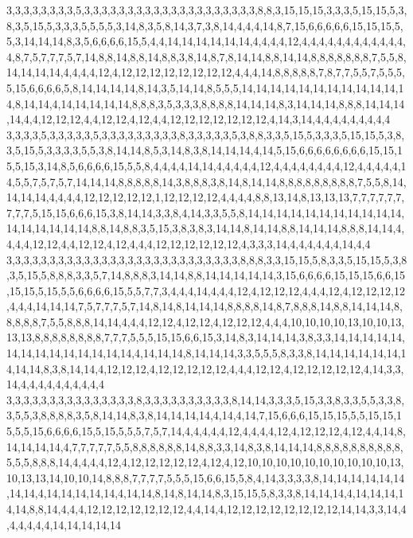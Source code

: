 3,3,3,3,3,3,3,3,5,3,3,3,3,3,3,3,3,3,3,3,3,3,3,3,3,3,3,3,3,8,8,3,15,15,15,3,3,3,5,15,15,5,3,8,3,5,15,5,3,3,3,5,5,5,5,3,14,8,3,5,8,14,3,7,3,8,14,4,4,4,14,8,7,15,6,6,6,6,6,15,15,15,5,5,3,14,14,14,8,3,5,6,6,6,6,15,5,4,4,14,14,14,14,14,14,4,4,4,4,12,4,4,4,4,4,4,4,4,4,4,4,4,4,8,7,5,7,7,7,5,7,14,8,8,14,8,8,14,8,8,3,8,14,8,7,8,14,14,8,8,14,14,8,8,8,8,8,8,8,7,5,5,8,14,14,14,14,4,4,4,4,12,4,12,12,12,12,12,12,12,12,4,4,4,14,8,8,8,8,8,7,8,7,7,5,5,7,5,5,5,5,15,6,6,6,6,5,8,14,14,14,14,8,14,3,5,14,14,8,5,5,5,14,14,14,14,14,14,14,14,14,14,14,14,8,14,14,4,14,14,14,14,14,8,8,8,3,5,3,3,3,8,8,8,8,14,14,14,8,3,14,14,14,8,8,8,14,14,14,14,4,4,12,12,12,4,4,12,12,4,12,4,4,12,12,12,12,12,12,12,4,14,3,14,4,4,4,4,4,4,4,4,4
3,3,3,3,5,3,3,3,3,3,5,3,3,3,3,3,3,3,3,3,8,3,3,3,3,3,5,3,8,8,3,3,5,15,5,3,3,3,5,15,15,5,3,8,3,5,15,5,3,3,3,3,5,5,3,8,14,14,8,5,3,14,8,3,8,14,14,14,4,14,5,15,6,6,6,6,6,6,6,6,15,15,15,5,15,3,14,8,5,6,6,6,6,15,5,5,8,4,4,4,4,14,14,4,4,4,4,4,12,4,4,4,4,4,4,4,4,12,4,4,4,4,4,14,5,5,7,5,7,5,7,14,14,14,8,8,8,8,8,14,3,8,8,8,3,8,14,8,14,14,8,8,8,8,8,8,8,8,8,7,5,5,8,14,14,14,14,4,4,4,4,12,12,12,12,12,1,12,12,12,12,4,4,4,4,8,8,13,14,8,13,13,13,7,7,7,7,7,7,7,7,7,5,15,15,6,6,6,15,3,8,14,14,3,3,8,4,14,3,3,5,5,8,14,14,14,14,14,14,14,14,14,14,14,14,14,14,14,14,14,8,8,14,8,8,3,5,15,3,8,3,8,3,14,14,8,14,14,8,8,14,14,14,8,8,8,14,14,4,4,4,4,12,12,4,4,12,12,4,12,4,4,4,12,12,12,12,12,12,4,3,3,3,14,4,4,4,4,4,4,14,4,4
3,3,3,3,3,3,3,3,3,3,3,3,3,3,3,3,3,3,3,3,3,3,3,3,3,3,3,8,8,8,3,3,15,15,5,8,3,3,5,15,15,5,3,8,3,5,15,5,8,8,8,3,3,5,7,14,8,8,8,3,14,14,8,8,14,14,14,14,14,3,15,6,6,6,6,15,15,15,6,6,15,15,15,5,15,5,5,6,6,6,6,15,5,5,7,7,3,4,4,4,14,4,4,4,12,4,12,12,12,4,4,4,12,4,12,12,12,12,4,4,4,14,14,14,7,5,7,7,7,5,7,14,8,14,8,14,14,14,8,8,8,8,14,8,7,8,8,8,14,8,8,14,14,14,8,8,8,8,8,7,5,5,8,8,8,14,14,4,4,4,12,12,4,12,12,4,12,12,12,4,4,4,10,10,10,10,13,10,10,13,13,13,8,8,8,8,8,8,8,8,7,7,7,5,5,5,15,15,6,6,15,3,14,8,3,14,14,14,3,8,3,3,14,14,14,14,14,14,14,14,14,14,14,14,14,14,4,14,14,14,8,14,14,14,3,3,5,5,5,8,3,3,8,14,14,14,14,14,14,14,14,14,8,3,8,14,14,4,12,12,12,4,12,12,12,12,12,4,4,4,12,12,4,12,12,12,12,12,4,14,3,3,14,4,4,4,4,4,4,4,4,4,4
3,3,3,3,3,3,3,3,3,3,3,3,3,3,3,8,3,3,3,3,3,3,3,3,3,3,8,14,14,3,3,3,5,15,3,3,8,3,3,5,5,3,3,8,3,5,5,3,8,8,8,8,3,5,8,14,14,8,3,8,14,14,14,14,4,14,4,14,7,15,6,6,6,15,15,15,5,5,15,15,15,5,5,15,6,6,6,6,15,5,15,5,5,5,7,5,7,14,4,4,4,4,4,12,4,4,4,4,12,4,12,12,12,4,12,4,4,14,8,14,14,14,14,4,7,7,7,7,7,5,5,8,8,8,8,8,8,14,8,8,3,3,14,8,3,8,14,14,14,8,8,8,8,8,8,8,8,8,8,5,5,5,8,8,8,14,4,4,4,4,12,4,12,12,12,12,12,4,12,4,12,10,10,10,10,10,10,10,10,10,10,13,10,13,13,14,10,10,14,8,8,8,7,7,7,7,5,5,5,15,6,6,15,5,8,4,14,3,3,3,3,8,14,14,14,14,14,14,14,14,4,14,14,14,14,14,4,14,14,8,14,8,14,14,8,3,15,15,5,8,3,3,8,14,14,14,4,14,14,14,14,14,8,8,14,4,4,4,12,12,12,12,12,12,12,4,4,14,4,12,12,12,12,12,12,12,12,14,14,3,3,14,4,4,4,4,4,4,14,14,14,14,14
